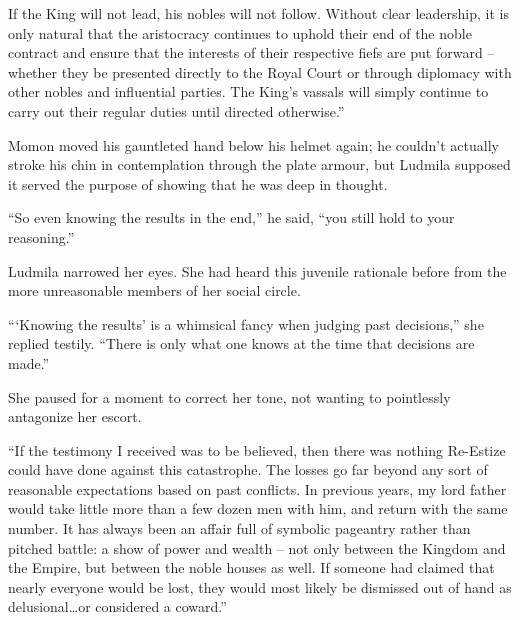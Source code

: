  

If the King will not lead, his nobles will not follow. Without clear leadership, it is only natural that the aristocracy continues to uphold their end of the noble contract and ensure that the interests of their respective fiefs are put forward – whether they be presented directly to the Royal Court or through diplomacy with other nobles and influential parties. The King’s vassals will simply continue to carry out their regular duties until directed otherwise.”

 

Momon moved his gauntleted hand below his helmet again; he couldn’t actually stroke his chin in contemplation through the plate armour, but Ludmila supposed it served the purpose of showing that he was deep in thought.

 

“So even knowing the results in the end,” he said, “you still hold to your reasoning.”

 

Ludmila narrowed her eyes. She had heard this juvenile rationale before from the more unreasonable members of her social circle.

 

“‘Knowing the results’ is a whimsical fancy when judging past decisions,” she replied testily. “There is only what one knows at the time that decisions are made.”

 

She paused for a moment to correct her tone, not wanting to pointlessly antagonize her escort.

 

“If the testimony I received was to be believed, then there was nothing Re-Estize could have done against this catastrophe. The losses go far beyond any sort of reasonable expectations based on past conflicts. In previous years, my lord father would take little more than a few dozen men with him, and return with the same number. It has always been an affair full of symbolic pageantry rather than pitched battle: a show of power and wealth – not only between the Kingdom and the Empire, but between the noble houses as well. If someone had claimed that nearly everyone would be lost, they would most likely be dismissed out of hand as delusional…or considered a coward.”